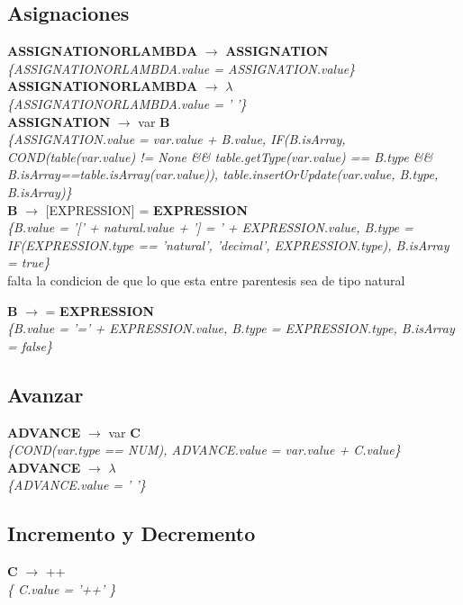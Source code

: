 \documentclass[10pt,a4paper]{article}
\begin{document}
\subsection{Asignaciones}


\textbf{ASSIGNATIONORLAMBDA} $\rightarrow$ \textbf{ASSIGNATION} \\
\textit{\{ASSIGNATIONORLAMBDA.value = ASSIGNATION.value\}} \\

\textbf{ASSIGNATIONORLAMBDA} $\rightarrow$ $\lambda$ \\
\textit{\{ASSIGNATIONORLAMBDA.value = ' '\}} \\

\textbf{ASSIGNATION} $\rightarrow$ var \textbf{B} \\
\textit{\{ASSIGNATION.value = var.value + B.value, 
IF(B.isArray, COND(table(var.value) != None \&\& table.getType(var.value) == B.type \&\& B.isArray==table.isArray(var.value)), table.insertOrUpdate(var.value, B.type, B.isArray)\}} \\

\textbf{B} $\rightarrow$ [EXPRESSION] = \textbf{EXPRESSION}  \\
\textit{\{B.value = '[' + natural.value + '] = ' + EXPRESSION.value, B.type = IF(EXPRESSION.type == 'natural', 'decimal', EXPRESSION.type), B.isArray = true\}} \\
falta la condicion de que lo que esta entre parentesis sea de tipo natural 


\textbf{B} $\rightarrow$ = \textbf{EXPRESSION} \\
\textit{\{B.value = '=' + EXPRESSION.value, B.type = EXPRESSION.type, B.isArray = false\}} \\

\subsection{Avanzar}
\textbf{ADVANCE} $\rightarrow$ var \textbf{C} \\
\textit{\{COND(var.type == NUM), ADVANCE.value = var.value + C.value\}} \\

\textbf{ADVANCE} $\rightarrow$ $\lambda$ \\
\textit{\{ADVANCE.value = ' '\}} \\


\subsection{Incremento y Decremento}
\textbf{C} $\rightarrow$ ++ \\ 
\textit{\{ C.value = '++' \}} \\
\end{document}
